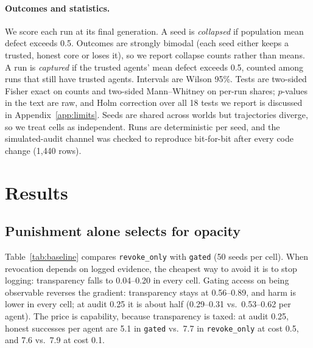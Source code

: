 \documentclass[11pt]{article}
\newcommand{\code}[1]{\texttt{#1}}
\begin{document}
\paragraph{Outcomes and statistics.} We score each run at its final generation. A seed is
\emph{collapsed} if population mean defect exceeds 0.5. Outcomes are strongly bimodal (each
seed either keeps a trusted, honest core or loses it), so we report collapse counts rather
than means. A run is \emph{captured} if the trusted agents' mean defect exceeds 0.5, counted
among runs that still have trusted agents. Intervals are Wilson 95\%. Tests are two-sided
Fisher exact on counts and two-sided Mann--Whitney on per-run shares; $p$-values in the text
are raw, and Holm correction over all 18 tests we report is discussed in
Appendix~\ref{app:limits}. Seeds are shared across worlds but trajectories diverge, so we
treat cells as independent. Runs are deterministic per seed, and the simulated-audit channel
was checked to reproduce bit-for-bit after every code change (1{,}440 rows).

\section{Results}
\label{sec:results}

\subsection{Punishment alone selects for opacity}

Table~\ref{tab:baseline} compares \code{revoke\_only} with \code{gated} (50 seeds per cell).
When revocation depends on logged evidence, the cheapest way to avoid it is to stop logging:
transparency falls to 0.04--0.20 in every cell. Gating access on being observable reverses the
gradient: transparency stays at 0.56--0.89, and harm is lower in every cell; at audit 0.25 it
is about half (0.29--0.31 vs.\ 0.53--0.62 per agent). The price is capability, because
transparency is taxed: at audit 0.25, honest successes per agent are 5.1 in \code{gated} vs.\
7.7 in \code{revoke\_only} at cost 0.5, and 7.6 vs.\ 7.9 at cost 0.1.
\end{document}
